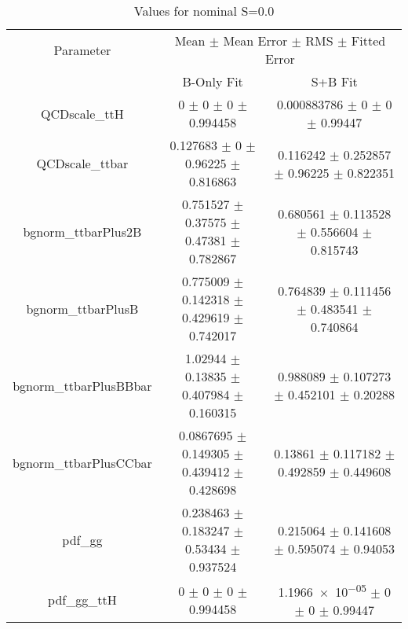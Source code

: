 \begin{table}
\centering
\caption{Values for nominal S=0.0}
\begin{tabular}{ccc}
\toprule
Parameter & \multicolumn{2}{c}{Mean $\pm$ Mean Error $\pm$ RMS $\pm$ Fitted Error}\\
 & B-Only Fit & S+B Fit\\
\midrule
QCDscale\_ttH & \num{0} $\pm$ \num{0} $\pm$ \num{0} $\pm$ \num{0.994458} & \num{0.000883786} $\pm$ \num{0} $\pm$ \num{0} $\pm$ \num{0.99447}\\
QCDscale\_ttbar & \num{0.127683} $\pm$ \num{0} $\pm$ \num{0.96225} $\pm$ \num{0.816863} & \num{0.116242} $\pm$ \num{0.252857} $\pm$ \num{0.96225} $\pm$ \num{0.822351}\\
bgnorm\_ttbarPlus2B & \num{0.751527} $\pm$ \num{0.37575} $\pm$ \num{0.47381} $\pm$ \num{0.782867} & \num{0.680561} $\pm$ \num{0.113528} $\pm$ \num{0.556604} $\pm$ \num{0.815743}\\
bgnorm\_ttbarPlusB & \num{0.775009} $\pm$ \num{0.142318} $\pm$ \num{0.429619} $\pm$ \num{0.742017} & \num{0.764839} $\pm$ \num{0.111456} $\pm$ \num{0.483541} $\pm$ \num{0.740864}\\
bgnorm\_ttbarPlusBBbar & \num{1.02944} $\pm$ \num{0.13835} $\pm$ \num{0.407984} $\pm$ \num{0.160315} & \num{0.988089} $\pm$ \num{0.107273} $\pm$ \num{0.452101} $\pm$ \num{0.20288}\\
bgnorm\_ttbarPlusCCbar & \num{0.0867695} $\pm$ \num{0.149305} $\pm$ \num{0.439412} $\pm$ \num{0.428698} & \num{0.13861} $\pm$ \num{0.117182} $\pm$ \num{0.492859} $\pm$ \num{0.449608}\\
pdf\_gg & \num{0.238463} $\pm$ \num{0.183247} $\pm$ \num{0.53434} $\pm$ \num{0.937524} & \num{0.215064} $\pm$ \num{0.141608} $\pm$ \num{0.595074} $\pm$ \num{0.94053}\\
pdf\_gg\_ttH & \num{0} $\pm$ \num{0} $\pm$ \num{0} $\pm$ \num{0.994458} & \num{1.1966e-05} $\pm$ \num{0} $\pm$ \num{0} $\pm$ \num{0.99447}\\
\bottomrule
\end{tabular}
\end{table}